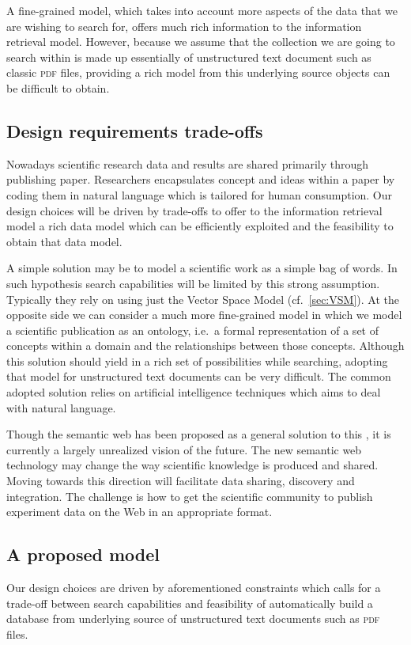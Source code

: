 A fine-grained model, which takes into account more aspects of the data that we are wishing to search for, offers much rich information to the information retrieval model. However, because we assume that the collection we are going to search within is made up essentially of unstructured text document such as classic \textsc{pdf} files, providing a rich model from this underlying source objects can be difficult to obtain.

\subsection{Design requirements trade-offs}
Nowadays scientific research data and results are shared primarily through publishing paper. Researchers encapsulates concept and ideas within a paper by coding them in natural language which is tailored for human consumption. Our design choices will be driven by trade-offs to offer to the information retrieval model a rich data model which can be efficiently exploited and the feasibility to obtain that data model.

A simple solution may be to model a scientific work as a simple bag of words. In such hypothesis search capabilities will be limited by this strong assumption. Typically they rely on using just the Vector Space Model (cf.\ \ref{sec:VSM}). At the opposite side we can consider a much more fine-grained model in which we model a scientific publication as an ontology, i.e.\ a formal representation of a set of concepts within a domain and the relationships between those concepts. Although this solution should yield in a rich set of possibilities while searching, adopting that model for unstructured text documents can be very difficult. The common adopted solution relies on artificial intelligence techniques which aims to deal with natural language.

Though the semantic web has been proposed as a general solution to this \cite{bernerslee2001psw}, it is currently a largely unrealized vision of the future. The new semantic web technology may change the way scientific knowledge is produced and shared. Moving towards this direction will facilitate data sharing, discovery and integration. The challenge is how to get the scientific community to publish experiment data on the Web in an appropriate format.

\subsection{\label{subsec:proposed_model}A proposed model} Our design choices are driven by aforementioned constraints which calls for a trade-off between search capabilities and feasibility of automatically build a database from underlying source of unstructured text documents such as \textsc{pdf} files.

